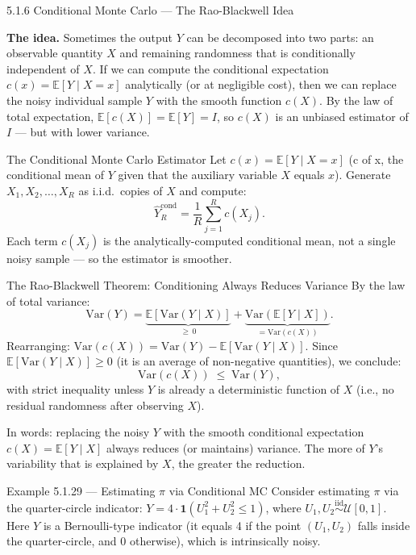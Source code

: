 \documentclass[aspectratio=169,10pt]{beamer}
\begin{document}
\begin{frame}[allowframebreaks]{5.1.6 Conditional Monte Carlo --- The Rao-Blackwell Idea}

\textbf{The idea.}
Sometimes the output $Y$ can be decomposed into two parts: an observable
quantity $X$ and remaining randomness that is conditionally independent of $X$.
If we can compute the conditional expectation $c(x) = \mathbb{E}[Y \mid X = x]$
analytically (or at negligible cost), then we can replace the noisy individual
sample $Y$ with the smooth function $c(X)$.
By the law of total expectation, $\mathbb{E}[c(X)] = \mathbb{E}[Y] = I$,
so $c(X)$ is an unbiased estimator of $I$ --- but with lower variance.

\begin{block}{The Conditional Monte Carlo Estimator}
  Let $c(x) = \mathbb{E}[Y \mid X = x]$ (c of x, the conditional mean of $Y$
  given that the auxiliary variable $X$ equals $x$).
  Generate $X_1, X_2, \ldots, X_R$ as i.i.d.\ copies of $X$ and compute:
  \[
    \hat{Y}_R^{\mathrm{cond}} = \frac{1}{R}\sum_{j=1}^R c(X_j).
  \]
  Each term $c(X_j)$ is the analytically-computed conditional mean, not a
  single noisy sample --- so the estimator is smoother.
\end{block}

\framebreak

\begin{block}{The Rao-Blackwell Theorem: Conditioning Always Reduces Variance}
  By the law of total variance:
  \[
    \mathrm{Var}(Y)
    = \underbrace{\mathbb{E}[\mathrm{Var}(Y\mid X)]}_{\ge\, 0}
    + \underbrace{\mathrm{Var}(\mathbb{E}[Y\mid X])}_{= \mathrm{Var}(c(X))}.
  \]
  Rearranging: $\mathrm{Var}(c(X)) = \mathrm{Var}(Y) - \mathbb{E}[\mathrm{Var}(Y\mid X)]$.
  Since $\mathbb{E}[\mathrm{Var}(Y\mid X)] \ge 0$ (it is an average of
  non-negative quantities), we conclude:
  \[
    \mathrm{Var}(c(X)) \;\le\; \mathrm{Var}(Y),
  \]
  with strict inequality unless $Y$ is already a deterministic function of $X$
  (i.e., no residual randomness after observing $X$).

  In words: replacing the noisy $Y$ with the smooth conditional expectation
  $c(X) = \mathbb{E}[Y\mid X]$ always reduces (or maintains) variance.
  The more of $Y$'s variability that is explained by $X$, the greater the
  reduction.
\end{block}

\framebreak

\begin{exampleblock}{Example 5.1.29 --- Estimating $\pi$ via Conditional MC}
  Consider estimating $\pi$ via the quarter-circle indicator:
  $Y = 4 \cdot \mathbf{1}(U_1^2 + U_2^2 \le 1)$,
  where $U_1, U_2 \overset{\mathrm{iid}}{\sim} \mathcal{U}[0,1]$.
  Here $Y$ is a Bernoulli-type indicator (it equals 4 if the point $(U_1, U_2)$
  falls inside the quarter-circle, and 0 otherwise), which is intrinsically noisy.


\end{exampleblock}
\end{frame}
\end{document}
